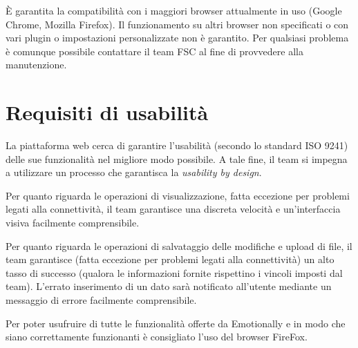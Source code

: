 È garantita la compatibilità con i maggiori browser attualmente in uso (Google 
Chrome, Mozilla Firefox). Il funzionamento su altri browser non specificati o 
con vari plugin o impostazioni personalizzate non è garantito. Per qualsiasi 
problema è comunque possibile contattare il team FSC al fine di provvedere alla 
manutenzione.

\section{Requisiti di usabilità}\label{sec:requisiti-di-usabilita}
La piattaforma web cerca di garantire l'usabilità (secondo lo standard ISO 
9241) delle sue funzionalità nel migliore modo possibile. A tale fine, il team 
si impegna a utilizzare un processo che garantisca la \textit{usability by 
design}.

Per quanto riguarda le operazioni di visualizzazione, fatta eccezione per 
problemi legati alla connettività, il team garantisce una discreta velocità e 
un'interfaccia visiva facilmente comprensibile.

Per quanto riguarda le operazioni di salvataggio delle modifiche e upload di 
file, il team garantisce (fatta eccezione per problemi legati alla 
connettività) un alto tasso di successo (qualora le informazioni fornite 
rispettino i vincoli imposti dal team). L'errato inserimento di un dato sarà 
notificato all'utente mediante un messaggio di errore facilmente comprensibile.

Per poter usufruire di tutte le funzionalità offerte da Emotionally e in modo 
che siano correttamente funzionanti è consigliato l'uso del browser FireFox.
